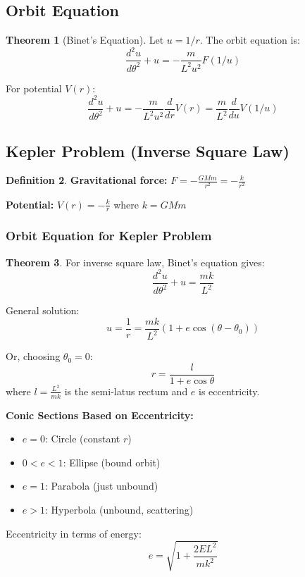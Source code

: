 \documentclass[12pt,a4paper]{article}
\theoremstyle{definition}
\newtheorem{theorem}{Theorem}[section]
\newtheorem{definition}[theorem]{Definition}
\begin{document}
\subsection{Orbit Equation}

\begin{theorem}[Binet's Equation]
Let $u = 1/r$. The orbit equation is:
\[
\frac{d^2u}{d\theta^2} + u = -\frac{m}{L^2u^2}F(1/u)
\]

For potential $V(r)$:
\[
\frac{d^2u}{d\theta^2} + u = -\frac{m}{L^2u^2}\frac{d}{dr}V(r) = \frac{m}{L^2}\frac{d}{du}V(1/u)
\]
\end{theorem}

\subsection{Kepler Problem (Inverse Square Law)}

\begin{definition}
\textbf{Gravitational force:} $F = -\frac{GMm}{r^2} = -\frac{k}{r^2}$

\textbf{Potential:} $V(r) = -\frac{k}{r}$ where $k = GMm$
\end{definition}

\subsubsection{Orbit Equation for Kepler Problem}

\begin{theorem}
For inverse square law, Binet's equation gives:
\[
\frac{d^2u}{d\theta^2} + u = \frac{mk}{L^2}
\]

General solution:
\[
u = \frac{1}{r} = \frac{mk}{L^2}(1 + e\cos(\theta - \theta_0))
\]

Or, choosing $\theta_0 = 0$:
\[
r = \frac{l}{1 + e\cos\theta}
\]
where $l = \frac{L^2}{mk}$ is the semi-latus rectum and $e$ is eccentricity.
\end{theorem}

\begin{importantbox}
\textbf{Conic Sections Based on Eccentricity:}
\begin{itemize}
    \item $e = 0$: Circle (constant $r$)
    \item $0 < e < 1$: Ellipse (bound orbit)
    \item $e = 1$: Parabola (just unbound)
    \item $e > 1$: Hyperbola (unbound, scattering)
\end{itemize}

Eccentricity in terms of energy:
\[
e = \sqrt{1 + \frac{2EL^2}{mk^2}}
\]
\end{importantbox}
\end{document}
